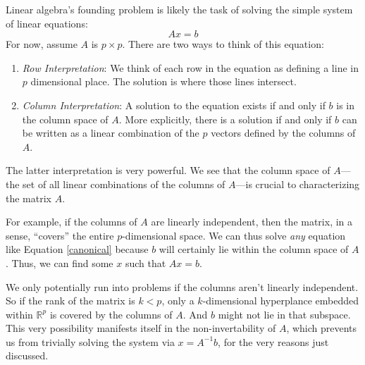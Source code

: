 \documentclass[12pt]{article}
\theoremstyle{plain}
\theoremstyle{definition}
\theoremstyle{remark}
\begin{document}
Linear algebra's founding problem is likely the task of solving the simple system of linear equations:
\begin{equation}
    \label{canonical}
    Ax = b
\end{equation}
For now, assume $A$ is $p\times p$. There are two ways to think of this equation:
\begin{enumerate}
    \item {\sl Row Interpretation}: We think of each row in the equation as defining a line in $p$ dimensional place. The solution is where those lines intersect.
    \item {\sl Column Interpretation}: A solution to the equation exists if and only if $b$ is in the column space of $A$. More explicitly, there is a solution if and only if $b$ can be written as a linear combination of the $p$ vectors defined by the columns of $A$.
\end{enumerate}
The latter interpretation is very powerful. We see that the column space of $A$---the set of all linear combinations of the columns of $A$---is crucial to characterizing the matrix $A$. 

For example, if the columns of $A$ are linearly independent, then the matrix, in a sense, ``covers'' the entire $p$-dimensional space. We can thus solve \emph{any} equation like Equation \ref{canonical} because $b$ will certainly lie within the column space of $A$. Thus, we can find some $x$ such that $Ax=b$. 

We only potentially run into problems if the columns aren't linearly independent. So if the rank of the matrix is $k<p$, only a $k$-dimensional hyperplance embedded within $\mathbb{R}^p$ is covered by the columns of $A$. And $b$ might not lie in that subspace. This very possibility manifests itself in the non-invertability of $A$, which prevents us from trivially solving the system via $x = A^{-1}b$, for the very reasons just discussed.






\end{document}
